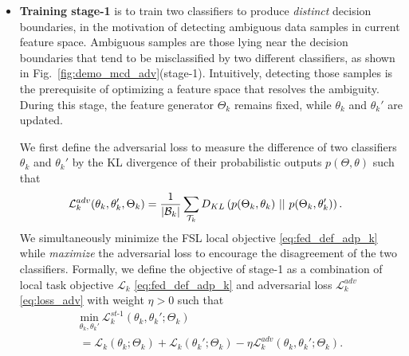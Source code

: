 \begin{itemize}[leftmargin=*]
    \item \textbf{Training stage-1} is to 
train two classifiers to produce \emph{distinct} decision boundaries, in the motivation of detecting ambiguous data samples in current feature space. Ambiguous samples are those lying near the decision boundaries that tend to be misclassified by two different classifiers, as shown in Fig.~\ref{fig:demo_mcd_adv}(stage-1). Intuitively, detecting those samples is the prerequisite of optimizing a feature space that resolves the ambiguity.
During this stage, the feature generator $\Theta_k$ remains fixed, while $\theta_k$ and $\theta_k'$ are updated.

We first define the adversarial loss to measure the difference of two classifiers $\theta_k$ and $\theta_k'$ by the KL divergence of their probabilistic outputs $p(\Theta, \theta)$ such that
\begin{equation}
\begin{split}
&\mathcal{L}_k^{adv}(\theta_k, \theta_k', \Theta_k) 
= \frac{1}{|\mathcal{B}_k|}\sum_{\mathcal{T}_k} D_{KL} \left (p(\Theta_k, \theta_k)~ ||~ p(\Theta_k, \theta_k') \right ).
\end{split}
\label{eq:loss_adv}
\end{equation}
We simultaneously minimize the FSL local objective \eqref{eq:fed_def_adp_k} while \emph{maximize} the adversarial loss to encourage the disagreement of the two classifiers. Formally,
we define the objective of stage-1 as a combination of local task objective $\mathcal{L}_k$ \eqref{eq:fed_def_adp_k} and adversarial loss $\mathcal{L}_k^{adv}$ \eqref{eq:loss_adv} with weight $\eta>0$ such that
\begin{multline}
\underset{\theta_k,\theta_k'}{\text{min}}  \ \mathcal{L}_k^{st\text{-}1}(\theta_k, \theta_k'; \Theta_k) \\ 
= \mathcal{L}_k (\theta_k; \Theta_k) +  \mathcal{L}_k (\theta_k'; \Theta_k) - \eta \mathcal{L}_k^{adv}(\theta_k, \theta_k' ; \Theta_k).
\label{eq:fed_mi_adv_1}
\end{multline}


\end{itemize}
